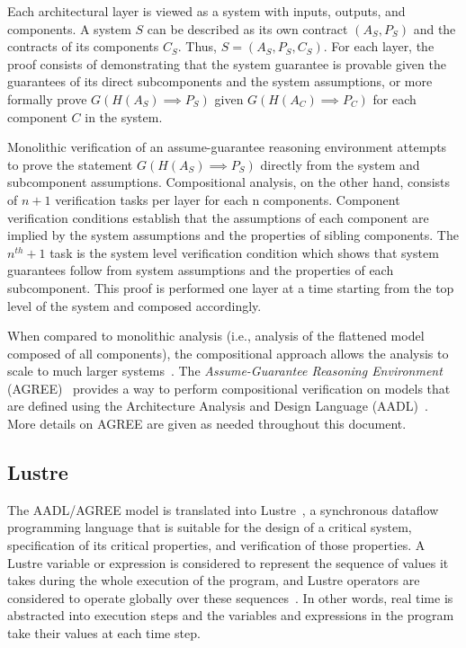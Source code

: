 Each architectural layer is viewed as a system with inputs, outputs, and components. A system $S$ can be described as its own contract $(A_S, P_S)$ and the contracts of its components $C_S$. Thus, $S = (A_S, P_S, C_S)$. For each layer, the proof consists of demonstrating that the system guarantee is provable given the guarantees of its direct subcomponents and the system assumptions, or more formally prove $G(H(A_S) \implies P_S)$ given $G(H(A_C) \implies P_C)$ for each component $C$ in the system.  

Monolithic verification of an assume-guarantee reasoning environment attempts to prove the statement $G(H(A_S) \implies P_S)$ directly from the system and subcomponent assumptions. Compositional analysis, on the other hand, consists of $n+1$ verification tasks per layer for each n components. Component verification conditions establish that the assumptions of each component are implied by the system assumptions and the properties of sibling components. The $n^{th}+1$ task is the system level verification condition which shows that system guarantees follow from system assumptions and the properties of each subcomponent. This proof is performed one layer at a time starting from the top level of the system and composed accordingly.

When compared to monolithic analysis (i.e., analysis of the flattened model composed of all components), the compositional approach allows the analysis to scale to much larger systems~\cite{NFM2012:CoGaMiWhLaLu}. The {\em Assume-Guarantee Reasoning Environment} (AGREE)~\cite{cofer2012compositional} provides a way to perform compositional verification on models that are defined using the Architecture Analysis and Design Language (AADL)~\cite{aerospace2012sae}. More details on AGREE are given as needed throughout this document.

\subsection{Lustre}
\label{sec:lustre}
The AADL/AGREE model is translated into Lustre~\cite{Halbwachs91:IEEE}, a synchronous dataflow programming language that is suitable for the design of a critical system, specification of its critical properties, and verification of those properties. A Lustre variable or expression is considered to represent the sequence of values it takes during the whole execution of the program, and Lustre operators are considered to operate globally over these sequences~\cite{Halbwachs91:IEEE}. In other words, real time is abstracted into execution steps and the variables and expressions in the program take their values at each time step. 

